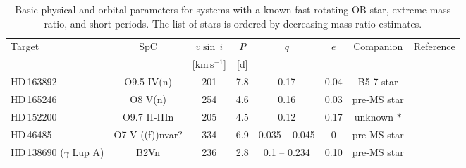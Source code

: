 \documentclass{aa}
\newcommand{\kms}{$\mathrm{km\,s^{-1}}$}
\newcommand{\vsini} {$v\sin\,i$}
\begin{document}
\begin{table*}[!htbp]
{\small
\caption{Basic physical and orbital parameters for systems with a known fast-rotating OB star, extreme mass ratio, and short periods. The list of stars is ordered by decreasing mass ratio estimates.}
\label{table:ref_fast}
\begin{tabular}{l |c c c c c c c}
\hline
\hline
Target                  & SpC    &  \vsini  & $P$ & $q$ &
                                                                       $e$  & Companion  & Reference \\
& & [\kms] & [d] & & & & \\
\hline
HD\,163892        &    O9.5 IV(n)       &     201       &    7.8     &  0.17              &   0.04     &  B5-7 star     &   \citet{Mahy_2022}     \\
HD\,165246        &    O8 V(n)          &     254         &    4.6     &  0.16               &   0.03   &  pre-MS star  &   \citet{Johnston2021}       \\
HD\,152200        &   O9.7 II-IIIn       &     205        &    4.5     &     0.12             &  0.17     &  unknown $\ast$   &   \citet{Britavskiy_2023}     \\
HD\,46485         &   O7 V ((f))nvar?    &     334        &    6.9     &     0.035 -- 0.045      &  0     &  pre-MS star     &   \citet{Naze_2023_rot}     \\
HD\,138690 ($\gamma$ Lup A)  &   B2Vn     &     236        &    2.8     &     0.1 -- 0.234            &  0.10    &  pre-MS star     &   \citet{Jerzykiewicz_2021}     \\

\end{tabular}}
\end{table*}
\end{document}
